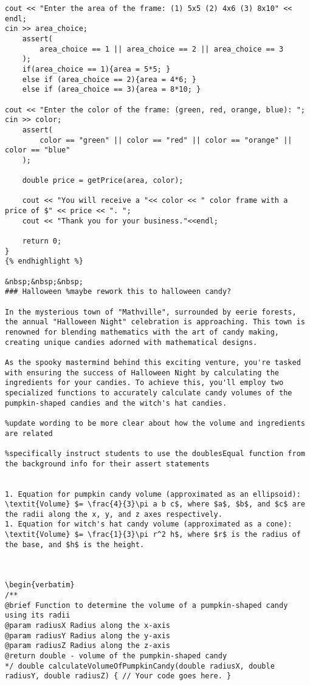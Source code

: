 {{{{{{{{\begin{verbatim}
cout << "Enter the area of the frame: (1) 5x5 (2) 4x6 (3) 8x10" << endl;
cin >> area_choice;
    assert(
        area_choice == 1 || area_choice == 2 || area_choice == 3
    );
    if(area_choice == 1){area = 5*5; }
    else if (area_choice == 2){area = 4*6; }
    else if (area_choice == 3){area = 8*10; }

cout << "Enter the color of the frame: (green, red, orange, blue): ";
cin >> color;
    assert(
        color == "green" || color == "red" || color == "orange" || color == "blue"
    );

    double price = getPrice(area, color);

    cout << "You will receive a "<< color << " color frame with a price of $" << price << ". ";
    cout << "Thank you for your business."<<endl;

    return 0;
}
{% endhighlight %}

&nbsp;&nbsp;&nbsp;
### Halloween %maybe rework this to halloween candy?

In the mysterious town of "Mathville", surrounded by eerie forests, the annual "Halloween Night" celebration is approaching. This town is renowned for blending mathematics with the art of candy making, creating unique candies adorned with mathematical designs.

As the spooky mastermind behind this exciting venture, you're tasked with ensuring the success of Halloween Night by calculating the ingredients for your candies. To achieve this, you'll employ two specialized functions to accurately calculate candy volumes of the pumpkin-shaped candies and the witch's hat candies. 

%update wording to be more clear about how the volume and ingredients are related

%specifically instruct students to use the doublesEqual function from the background info for their assert statements


1. Equation for pumpkin candy volume (approximated as an ellipsoid): \textit{Volume} $= \frac{4}{3}\pi a b c$, where $a$, $b$, and $c$ are the radii along the x, y, and z axes respectively.
1. Equation for witch's hat candy volume (approximated as a cone): \textit{Volume} $= \frac{1}{3}\pi r^2 h$, where $r$ is the radius of the base, and $h$ is the height.



\begin{verbatim}
/**
@brief Function to determine the volume of a pumpkin-shaped candy using its radii
@param radiusX Radius along the x-axis
@param radiusY Radius along the y-axis
@param radiusZ Radius along the z-axis
@return double - volume of the pumpkin-shaped candy
*/ double calculateVolumeOfPumpkinCandy(double radiusX, double radiusY, double radiusZ) { // Your code goes here. }


\end{verbatim}}}}}}}}}

